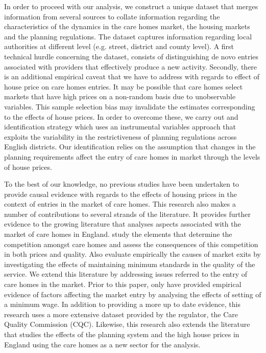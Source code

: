 \documentclass[12pt,letterpaper]{article}
\begin{document}
In order to proceed with our analysis, we construct a unique dataset that merges information from several 
sources to collate information regarding the characteristics of the dynamics in the care homes market, the
 housing markets and the planning regulations. The dataset captures information regarding local authorities 
 at different level (e.g. street, district and county level). A first technical hurdle concerning the dataset, consists
  of distinguishing de novo entries associated with providers that effectively produce a new activity. Secondly, 
  there is an additional empirical caveat that we have to address with regards to effect of house price on care
   homes entries. It may be possible that care homes select markets that have high prices on a non-random 
   basis due to unobservable variables. This sample selection bias may invalidate the estimates corresponding
    to the effects of house prices. In order to overcome these, we carry out and identification strategy which 
    uses an instrumental variables approach that exploits the variability in the restrictiveness of planning
     regulations across English districts. Our identification relies on the assumption that changes in the planning
      requirements affect the entry of care homes in market through the levels of house prices. 
      
To the best of our knowledge, no previous studies have been undertaken to provide causal evidence with
 regards to the effects of housing prices in the context of entries in the market of care homes. This research
  also makes a number of contributions to several strands of the literature. It provides further evidence to the 
  growing literature that analyses aspects associated with the market of care homes in England. \citet{forder2014} study the elements that determine the competition amongst care homes and assess the 
  consequences of this competition in both prices and quality. Also \citet{allan2015} evaluate empirically 
  the causes of market exits by investigating the effects of maintaining minimum standards in the quality of 
  the service. We extend this literature by addressing issues referred to the entry of care homes in the market. 
  Prior to this paper, only \cite{machin2003} have provided empirical evidence of factors affecting the market
   entry by analysing the effects of setting of a minimum wage. In addition to providing a more up to date
    evidence, this research uses a more extensive dataset provided by the regulator, the
     Care Quality Commission (CQC). Likewise, this research also extends the literature that studies the effects 
     of the planning system and the high house prices in England using the care homes as a new sector
      for the analysis. 
      
\end{document}
